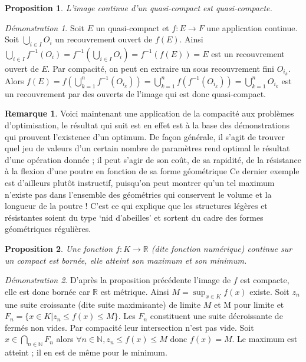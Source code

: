 \documentclass[a4paper, 11pt, french]{book}
\theoremstyle{plain} %
\newtheorem{proposition}{Proposition}
\theoremstyle{definition} %
\newtheorem{remarque}{Remarque}
\theoremstyle{remark} %
\newtheorem*{demonstration}{Démonstration}
\newcommand{\1}{\mathds{1}}
\newcommand{\infegal}{\leqslant}
\newcommand{\inv}[1]{#1^{-1}}
\newcommand{\N}{\mathbb{N}}
\newcommand{\R}{\mathbb{R}}
\begin{document}
\begin{proposition}
	L’image continue d’un quasi-compact est quasi-compacte.
\end{proposition}

\begin{demonstration}
	Soit $E$ un quasi-compact et $f:E\rightarrow F$ une application continue.
	Soit $\bigcup_{i\in I}O_i$ un recouvrement ouvert de $f(E)$.
	Ainsi $\bigcup_{i\in I}\inv{f}(O_i)=\inv{f}(\bigcup_{i\in I}O_i)=\inv{f}(f(E))=E$ est un recouvrement ouvert de $E$.
	Par compacité, on peut en extraire un sous recouvrement fini $O_{i_k}$.
	Alors $f(E)=f(\bigcup_{k=1}^n\inv{f}(O_{i_k}))=\bigcup_{k=1}^nf(\inv{f}(O_{i_k}))=\bigcup_{k=1}^nO_{i_k}$ est un recouvrement par des ouverts de l'image qui est donc quasi-compact.
\end{demonstration}

\begin{remarque}
	Voici maintenant une application de la compacité aux problèmes d’optimisation, le résultat qui suit est en effet est à la base des démonstrations qui prouvent l’existence d’un optimum.
	De façon générale, il s’agit de trouver quel jeu de valeurs d’un certain nombre de paramètres rend optimal le résultat d’une opération donnée ; il peut s’agir de son coût, de sa rapidité, de la résistance à la flexion d’une poutre en fonction de sa forme géométrique Ce dernier exemple est d’ailleurs plutôt instructif, puisqu’on peut montrer qu’un tel maximum n’existe pas dans l’ensemble des géométries qui conservent le volume et la longueur de la poutre !
	C’est ce qui explique que les structures légères et résistantes soient du type ‘nid d’abeilles’ et sortent du cadre des formes géométriques régulières.
\end{remarque}

\begin{proposition}
	Une fonction $f:K\rightarrow\R$ (dite fonction numérique) continue sur un compact est bornée, elle atteint son maximum et son minimum.
\end{proposition}

\begin{demonstration}
	D’après la proposition précédente l’image de $f$ est compacte, elle est donc bornée car $\R$ est métrique.
	Ainsi $M=\sup_{x\in K}f(x)$ existe.
	Soit $z_n$ une suite croissante (dite suite maximisante) de limite $M$ et  M pour limite et $F_n=\{x\in K | z_n\infegal f(x)\infegal M\}$.
	Les $F_n$ constituent une suite décroissante de fermés non vides.
	Par compacité leur intersection n’est pas vide.
	Soit $x\in\bigcap_{n\in\N}F_n$ alors $\forall n\in\N, z_n\infegal f(x)\infegal M$ donc $f(x)=M$.
	Le maximum est atteint ; il en est de même pour le minimum.
\end{demonstration}
\end{document}
